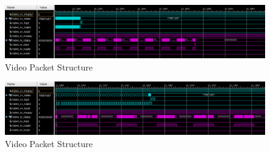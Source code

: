 \begin{figure}[htbp]
    \begin{center}
        \includegraphics[bb=0 0 1199 246,width=15.5cm]{img/fpga-ila-hdmi.png}
    \end{center}
    \caption{Video Packet Structure}
    \label{fig:fpga-ila-hdmi}
\end{figure}

\begin{figure}[htbp]
    \begin{center}
        \includegraphics[bb=0 0 1197 246,width=15.5cm]{img/fpga-ila-hdmi-x2.png}
    \end{center}
    \caption{Video Packet Structure}
    \label{fig:fpga-ila-hdmi-x2}
\end{figure}
